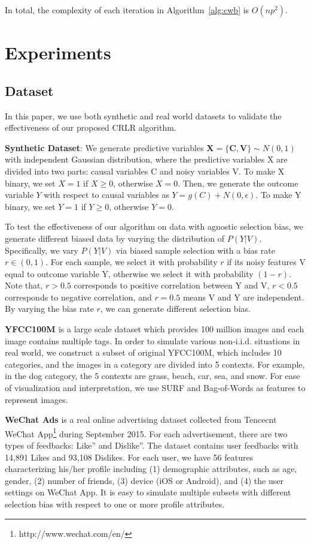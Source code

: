 \documentclass[sigconf]{acmart}
\begin{document}
In total, the complexity of each iteration in Algorithm~\ref{alg:cwb} is $O(np^2)$.

\section{Experiments}\subsection{Dataset}
In this paper, we use both synthetic and real world datasets to validate the effectiveness of our proposed CRLR algorithm.

\textbf{Synthetic Dataset}: We generate predictive variables $\mathbf{X} = \{\mathbf{C},\mathbf{V}\} \sim N(0,1)$ with independent Gaussian distribution, where the predictive variables X are divided into two parts: causal variables C and noisy variables V.
To make X binary, we set $X = 1$ if $X \geq 0$, otherwise $X = 0$.
Then, we generate the outcome variable $Y$ with respect to causal variables as $Y = g(C)+N(0,\epsilon)$.
To make Y binary, we set $Y = 1$ if $Y \geq 0$, otherwise $Y = 0$.

To test the effectiveness of our algorithm on data with agnostic selection bias, we generate different biased data by varying the distribution of $P(Y|V)$.
Specifically, we vary $P(Y|V)$ via biased sample selection with a bias rate $r\in(0,1)$.
For each sample, we select it with probability $r$ if its noisy features V equal to outcome variable Y, otherwise we select it with probability $(1-r)$.
Note that, $r > 0.5$ corresponds to positive correlation between Y and V, $r < 0.5$ corresponds to negative correlation, and $r = 0.5$ means V and Y are independent.
By varying the bias rate $r$, we can generate different selection bias.

\textbf{YFCC100M \cite{thomee2016yfcc100m}} is a large scale dataset which provides 100 million images and each image contains multiple tags.
In order to simulate various non-i.i.d. situations in real world, we construct a subset of original YFCC100M, which includes 10 categories, and the images in a category are divided into 5 contexts.
For example, in the dog category, the 5 contexts are grass, beach, car, sea, and snow.
For ease of visualization and interpretation, we use SURF \cite{bay2006surf} and Bag-of-Words \cite{csurka2004visual} as features to represent images.

\textbf{WeChat Ads} is a real online advertising dataset collected from Tencecnt WeChat App\footnote{http://www.wechat.com/en/} during September 2015.
For each advertisement, there are two types of feedbacks: Like” and Dislike”.
The dataset contains user feedbacks with 14,891 Likes and 93,108 Dislikes.
For each user, we have 56 features characterizing his/her profile including (1) demographic attributes, such as age, gender, (2) number of friends, (3) device (iOS or Android), and (4) the user settings on WeChat App.
It is easy to simulate multiple subsets with different selection bias with respect to one or more profile attributes.
\end{document}
